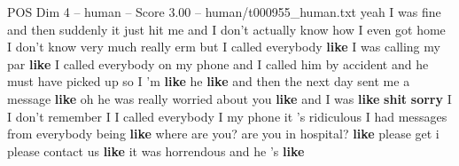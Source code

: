 \begin{textsample}{POS Dim 4 – human – Score 3.00 – human/t000955\_human.txt}  \label{ex:f4_pos_019}
yeah I was fine and then suddenly it just hit me and I don't actually know how I even got home I don't know very much really erm but I called everybody \textbf{like} I was calling my par \textbf{like} I called everybody on my phone and I called him by accident and he must have picked up so I 'm \textbf{like} he \textbf{like} and then the next day sent me a message \textbf{like} oh he was really worried about you \textbf{like} and I was \textbf{like} \textbf{shit} \textbf{sorry} I I don't remember I I called everybody I my phone it 's ridiculous I had messages from everybody being \textbf{like} where are you? are you in hospital? \textbf{like} please get i please contact us \textbf{like} it was horrendous and he 's \textbf{like}

\end{textsample}
